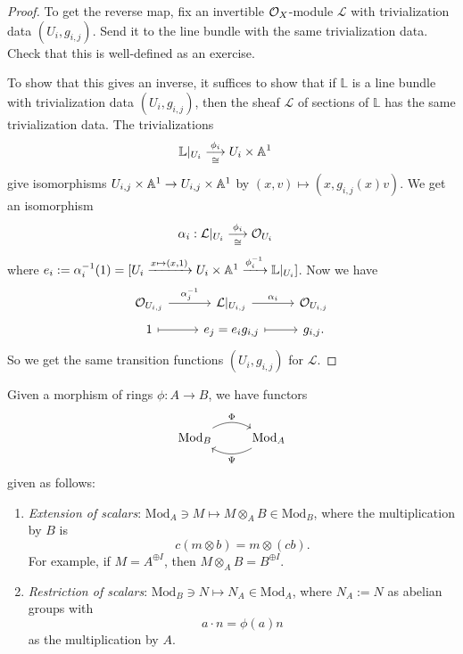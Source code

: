 \begin{proof}
  To get the reverse map, fix
  an invertible $\mathcal{O}_X$-module
  $\mathcal{L}$ with trivialization
  data $(U_i, g_{i, j})$. Send it
  to the line bundle with the same
  trivialization data.
  Check that this is well-defined
  as an exercise.

  To show that this gives an inverse,
  it suffices to show that if
  $\mathbb{L}$ is a line bundle
  with trivialization data
  $(U_i, g_{i, j})$, then the sheaf
  $\mathcal{L}$ of sections of
  $\mathbb{L}$ has the same
  trivialization data.
  The trivializations
  \begin{align*}
    \mathbb{L}|_{U_i}
    &\underset{\cong}{\overset{\phi_i}{\longrightarrow}}
    U_i \times \mathbb{A}^1
  \end{align*}
  give isomorphisms
  $U_{i, j} \times \mathbb{A}^1 \to U_{i, j} \times \mathbb{A}^1$
  by $(x, v) \mapsto (x, g_{i, j}(x) v)$.
  We get an isomorphism
  \begin{align*}
    \alpha_i :
    \mathcal{L}|_{U_i}
    &\underset{\cong}{\overset{\phi_i}{\longrightarrow}}
    \mathcal{O}_{U_i}
  \end{align*}
  where $e_i := \alpha_i^{-1}(1) = [U_i \xrightarrow{x \mapsto (x, 1)} U_i \times \mathbb{A}^1 \xrightarrow{\phi_i^{-1}} \mathbb{L}|_{U_i}]$.
  Now we have
  \[
    \begin{tikzcd}[row sep=tiny]
      \OO_{U_{i, j}}
      \ar[r, "\alpha_j^{-1}"]
      & \mathcal{L}|_{U_{i, j}}
      \ar[r, "\alpha_i"]
      & \OO_{U_{i, j}} \\
      1 \ar[r, mapsto]
      & e_j = e_i g_{i, j}
      \ar[r, mapsto] & g_{i, j}.
    \end{tikzcd}
  \]
  So we get the same transition
  functions $(U_i, g_{i, j})$
  for $\mathcal{L}$.
\end{proof}

\begin{remark}
  Given a morphism of rings
  $\phi : A \to B$, we have functors
  \[
    \begin{tikzcd}
      \mathrm{Mod}_B
      \ar[r, bend left, "\Phi"]
      & \mathrm{Mod}_A
      \ar[l, bend left, "\Psi"]
    \end{tikzcd}
  \]
  given as follows:
  \begin{enumerate}
    \item \emph{Extension of scalars}:
      $\mathrm{Mod}_A \ni M \longmapsto M \otimes_A B \in \mathrm{Mod}_B$,
      where the multiplication by $B$
      is
      \[
        c (m \otimes b)
        = m \otimes (cb).
      \]
      For example, if
      $M = A^{\oplus I}$, then
      $M \otimes_A B = B^{\oplus I}$.
    \item \emph{Restriction of scalars}:
      $\mathrm{Mod}_B \ni N \longmapsto N_A \in \mathrm{Mod}_A$,
      where $N_A := N$ as
      abelian groups with
      \[
        a \cdot n = \phi(a) n
      \]
      as the multiplication by $A$.
  \end{enumerate}
\end{remark}


